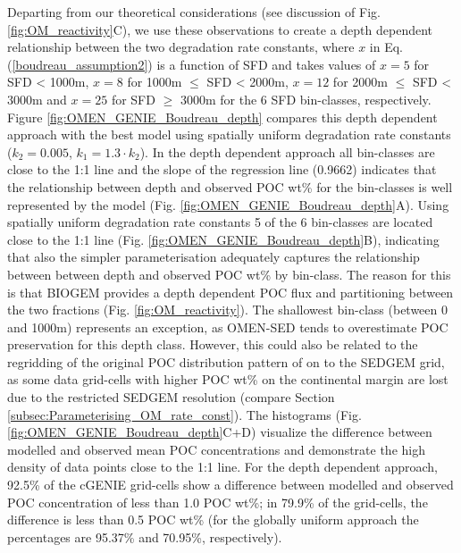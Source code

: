 \documentclass[gmd, manuscript]{copernicus}
\begin{document}
Departing from our theoretical considerations (see discussion of Fig. \ref{fig:OM_reactivity}C), we use these observations to create a depth dependent relationship between the two degradation rate constants, where $x$ in 
Eq. (\ref{boudreau_assumption2}) is a function of SFD and takes values of $x=5$ for SFD < 1000m, $x=8$ for 1000m $\leq$ SFD < 2000m, $x=12$ for 2000m $\leq$ SFD < 3000m and $x=25$ for SFD $\geq$ 3000m for the 6 SFD bin-classes, respectively. 
Figure \ref{fig:OMEN_GENIE_Boudreau_depth} compares this depth dependent approach with the best model using spatially uniform degradation rate constants ($k_2 = 0.005$, $k_1 = 1.3\cdot k_2$). 
In the depth dependent approach all bin-classes are close to the 1:1 line and %
the slope of the regression line (0.9662) indicates that the relationship between depth and observed POC wt\% for the bin-classes is well represented by the model (Fig. \ref{fig:OMEN_GENIE_Boudreau_depth}A). 
Using spatially uniform degradation rate constants 5 of the 6 bin-classes are located close to the 1:1 line (Fig. \ref{fig:OMEN_GENIE_Boudreau_depth}B), indicating that also the simpler parameterisation adequately  
captures the relationship between between depth and observed POC wt\% by bin-class. The reason for this is that BIOGEM provides a depth dependent POC flux and partitioning between the two fractions (Fig. \ref{fig:OM_reactivity}). 
The shallowest bin-class (between 0 and 1000m) represents an exception, as OMEN-SED tends to overestimate POC preservation for this depth class. However, this could also be related to the regridding of the original POC distribution 
pattern of \citep{seiter_organic_2004} on to the SEDGEM grid, as some data grid-cells with higher POC wt\% on the continental margin are lost due to the restricted SEDGEM resolution (compare Section \ref{subsec:Parameterising_OM_rate_const}). 
The histograms (Fig. \ref{fig:OMEN_GENIE_Boudreau_depth}C+D) visualize the difference between modelled and observed mean POC concentrations and demonstrate the high density of data points close to the 1:1 line. 
For the depth dependent approach, 92.5\% of the cGENIE grid-cells show a difference between modelled and observed POC concentration of less than 1.0 POC wt\%; in 79.9\% of the grid-cells, the difference is less than 0.5 POC wt\% 
(for the globally uniform approach the percentages are 95.37\% and 70.95\%, respectively). 
\end{document}
